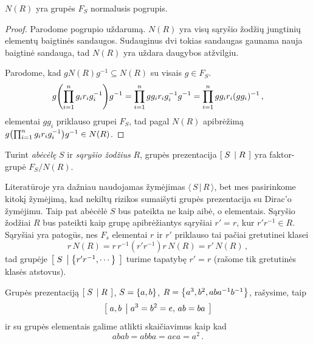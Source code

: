 \begin{proposition}
	$N(R)$ yra grupės $F_S$ normalusis pogrupis.
\end{proposition}
\begin{proof}
	Parodome pogrupio uždarumą.
	$N(R)$ yra visų sąryšio žodžių jungtinių elementų baigtinės sandaugos.
	Sudauginus dvi tokias sandaugas gaunama nauja baigtinė sandauga,
	tad $N(R)$ yra uždara daugybos atžvilgiu.

	Parodome, kad $gN(R)g^{-1} \subseteq N(R)$ su visais $g \in F_S$.
	\begin{equation}
		g\qty(\prod_{i=1}^n g_i r_i g_i^{-1})g^{-1} 
		= \prod_{i=1}^n g g_i r_i g_i^{-1}g^{-1}
		= \prod_{i=1}^n g g_i r_i (g g_i)^{-1}
		\,,
	\end{equation}
	elementai $g g_i$ priklauso grupei $F_S$,
	tad pagal $N(R)$ apibrėžimą $g\qty(\prod_{i=1}^n g_i r_i g_i^{-1})g^{-1} \in N(R)$.
\end{proof}


\begin{definition}
	Turint \emph{abėcėlę} $S$ ir \emph{sąryšio žodžius} $R$,
	grupės prezentacija $\left[\; S \;\left|\; R \;\right.\right]$ yra faktor-grupė $F_S/N(R)$.
\end{definition}

\begin{remark}
	Literatūroje yra dažniau naudojamas žymėjimas $\langle\,S\,|\,R\,\rangle$,
	bet mes pasirinkome kitokį žymėjimą,
	kad nekiltų rizikos sumaišyti grupės prezentacija su Dirac'o  žymėjimu.
	Taip pat abėcėlė $S$ bus pateikta ne kaip aibė, o elementais.
	Sąryšio žodžiai $R$ bus pateikti kaip grupę apibrėžiantys sąryšiai
	$r' = r$, kur $r'r^{-1}\in R$.
	Sąryšiai yra patogūs, nes $F_s$ elementai $r$ ir $r'$ priklauso
	tai pačiai gretutinei klasei
	\begin{equation}
		r\, N(R)
		= r\, r^{-1}	(r'r^{-1})	r \,N(R)
		= r'\,N(R)
		\,,
	\end{equation}
	tad grupėje $\left[\; S \;\left|\; \qty{r'r^{-1},\cdots} \;\right.\right]$
	turime tapatybę $r' = r$ (rašome tik gretutinės klasės atstovus).
\end{remark}

\begin{example}
	Grupės prezentaciją
	$ \left[\; S \;\left|\; R \;\right.\right] $, $ S = \qty{a, b} $,
	$ R = \qty{a^3, b^2, aba^{-1}b^{-1}} $,
	rašysime, taip 
	\begin{equation}
		\left[\; a,b \;\left|\; a^3 = b^2 = e ,\, ab = ba \;\right.\right]
	\end{equation}
	ir su grupės elementais galime atlikti skaičiavimus kaip kad
	\begin{equation}
		abab = abba = aea = a^2
		\,.
	\end{equation}
\end{example}


